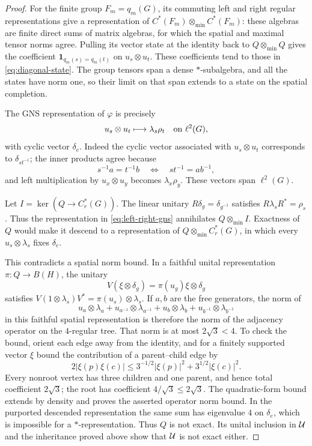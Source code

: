 \begin{proof}
For the finite group $F_m=q_m(G)$, its commuting left and right
regular representations give a representation of
$C^*(F_m)\otimes_{\min}C^*(F_m)$: these algebras are finite direct
sums of matrix algebras, for which the spatial and maximal tensor
norms agree.  Pulling its vector state at the identity back to
$Q\otimes_{\min}Q$ gives the coefficient
$\boldsymbol{1}_{q_m(s)=q_m(t)}$ on $u_s\otimes u_t$.
These coefficients tend to those in \eqref{eq:diagonal-state}.
The group tensors span a dense $*$-subalgebra, and all the states have
norm one, so their limit on that span extends to a state on the
spatial completion.

The GNS representation of $\varphi$ is precisely
\begin{equation}\label{eq:left-right-gns}
 u_s\otimes u_t\longmapsto\lambda_s\rho_t
 \quad\hbox{on }\ell^2(G),
\end{equation}
with cyclic vector $\delta_e$.  Indeed the cyclic vector associated
with $u_s\otimes u_t$ corresponds to $\delta_{st^{-1}}$; the inner
products agree because
\[
 s^{-1}a=t^{-1}b\quad\Longleftrightarrow\quad st^{-1}=ab^{-1},
\]
and left multiplication by $u_x\otimes u_y$ becomes
$\lambda_x\rho_y$.  These vectors span $\ell^2(G)$.

Let $I=\ker(Q\to C_r^*(G))$.  The linear unitary
$R\delta_g=\delta_{g^{-1}}$ satisfies $R\lambda_sR^*=\rho_s$.
Thus the representation in \eqref{eq:left-right-gns} annihilates
$Q\otimes_{\min}I$.  Exactness of $Q$ would make it descend to a
representation of $Q\otimes_{\min}C_r^*(G)$, in which every
$u_s\otimes\lambda_s$ fixes $\delta_e$.

This contradicts a spatial norm bound.  In a faithful unital
representation $\pi:Q\to B(H)$, the unitary
\[
 V(\xi\otimes\delta_g)=\pi(u_g)\xi\otimes\delta_g
\]
satisfies
$V(1\otimes\lambda_s)V^*=\pi(u_s)\otimes\lambda_s$.
If $a,b$ are the free generators, the norm of
\[
 u_a\otimes\lambda_a+u_{a^{-1}}\otimes\lambda_{a^{-1}}
 +u_b\otimes\lambda_b+u_{b^{-1}}\otimes\lambda_{b^{-1}}
\]
in this faithful spatial representation is therefore the norm of the
adjacency operator on the $4$-regular tree.  That norm is at most
$2\sqrt3<4$.  To check the bound, orient each edge away from the
identity, and for a finitely supported vector $\xi$ bound the
contribution of a parent--child edge by
\[
 2|\xi(p)\xi(c)|
 \leq 3^{-1/2}|\xi(p)|^2+3^{1/2}|\xi(c)|^2.
\]
Every nonroot vertex has three children and one parent, and hence
total coefficient $2\sqrt3$; the root has coefficient
$4/\sqrt3\leq2\sqrt3$.  The quadratic-form bound extends by density
and proves the asserted operator norm bound.  In the purported
descended representation the same sum has eigenvalue $4$ on
$\delta_e$, which is impossible for a $*$-representation.
Thus $Q$ is not exact.  Its unital inclusion in $\mathcal U$ and the
inheritance proved above show that $\mathcal U$ is not exact either.
\end{proof}

